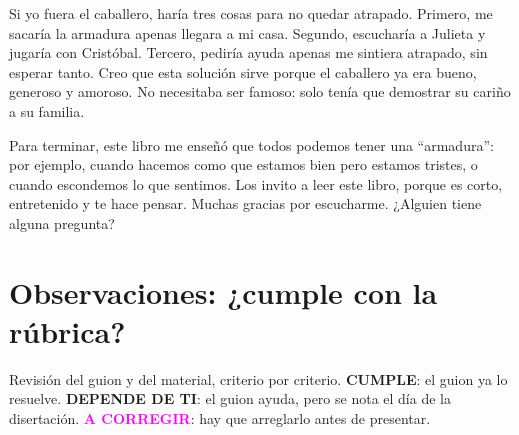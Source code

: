 \documentclass[12pt,a4paper]{article}
\begin{document}
\begin{tcolorbox}[enhanced, breakable, colback=verde!6, colframe=verde, boxrule=1.2pt,
  arc=3mm, left=10pt, right=10pt, top=8pt, bottom=8pt, coltext=verde!70!black]
Si yo fuera el caballero, haría tres cosas para no quedar atrapado. Primero, me sacaría la armadura
apenas llegara a mi casa. Segundo, escucharía a Julieta y jugaría con Cristóbal. Tercero, pediría ayuda apenas me sintiera
atrapado, sin esperar tanto. Creo que esta solución sirve porque el caballero ya era bueno, generoso y amoroso. No
necesitaba ser famoso: solo tenía que demostrar su cariño a su familia.

Para terminar, este libro me enseñó que todos podemos tener una “armadura”: por ejemplo, cuando
hacemos como que estamos bien pero estamos tristes, o cuando escondemos lo que sentimos. Los invito a leer este libro,
porque es corto, entretenido y te hace pensar. Muchas gracias por escucharme. ¿Alguien tiene alguna pregunta?
\end{tcolorbox}

\newpage
\section*{\color{verde}Observaciones: ¿cumple con la rúbrica?}
Revisión del guion y del material, criterio por criterio.
\textcolor{verde}{\textbf{CUMPLE}}: el guion ya lo resuelve.
\textcolor{oro!80!black}{\textbf{DEPENDE DE TI}}: el guion ayuda, pero se nota el día de la disertación.
\textcolor{magenta}{\textbf{A CORREGIR}}: hay que arreglarlo antes de presentar.

\newcommand{\si}{\textcolor{verde}{\textbf{CUMPLE}}}
\newcommand{\ojo}{\textcolor{oro!80!black}{\textbf{DEPENDE DE TI}}}
\newcommand{\no}{\textcolor{magenta}{\textbf{A CORREGIR}}}
\end{document}
